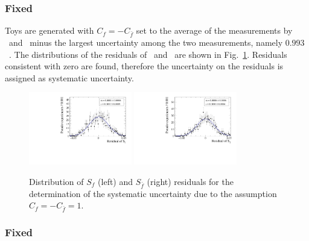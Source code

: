 \subsubsection[Fixed $C_f$]{Fixed }
\label{sec:syst_toys_fixC}

Toys are generated with $C_f=-C_{\bar f}$ set to the average of the measurements by \belle~and \babar~minus the
largest uncertainty among the two measurements, namely $0.993$~\cite{Aubert:2008zi, Das:2010be}.
The distributions of the residuals of \Sf~and \Sfb~are shown in Fig.~\ref{fig:CSystToys}. Residuals
consistent with zero are found, therefore the uncertainty on the residuals is assigned as systematic
uncertainty.
\begin{figure}[htbp]
	\begin{center}
		\includegraphics[width=0.4\textwidth]{06Systematics/figs/C_Sf_res.pdf}
		\includegraphics[width=0.4\textwidth]{06Systematics/figs/C_Sfbar_res.pdf}
	\end{center}
        \vspace{-2mm}
	\caption{Distribution of $S_f$ (left) and $S_{\bar f}$ (right) residuals for the determination of the systematic uncertainty due to the assumption $C_f=-C_{\bar f}=1$.}
	\label{fig:CSystToys}
\end{figure}

\subsubsection[Fixed $\Delta\Gamma$]{Fixed \boldmath{$\Delta\Gamma$}}
\label{sec:syst_toys_deltaGamma}

